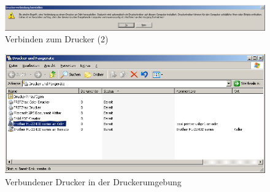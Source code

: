 \begin{figure}[hbt!]
\centering
\includegraphics[width=\columnwidth]{image021}
\caption{Verbinden zum Drucker (2)}
\label{fig:sambalpd:connect:2}
\end{figure}

\begin{figure}[hbt!]
\centering
\includegraphics[width=\columnwidth]{image022}
\caption{Verbundener Drucker in der Druckerumgebung}
\label{fig:sambalpd:printer-environment}
\end{figure}

